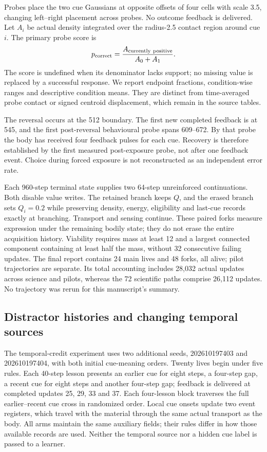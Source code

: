 Probes place the two cue Gaussians at opposite offsets of four cells with scale 3.5, changing left--right placement across probes. No outcome feedback is delivered. Let $A_i$ be actual density integrated over the radius-2.5 contact region around cue $i$. The primary probe score is
\begin{equation}
p_{\rm correct}=\frac{A_{\rm currently\ positive}}{A_0+A_1}.
\end{equation}
The score is undefined when its denominator lacks support; no missing value is replaced by a successful response. We report endpoint fractions, condition-wise ranges and descriptive condition means. They are distinct from time-averaged probe contact or signed centroid displacement, which remain in the source tables.

The reversal occurs at the 512 boundary. The first new completed feedback is at 545, and the first post-reversal behavioural probe spans 609--672. By that probe the body has received four feedback pulses for each cue. Recovery is therefore established by the first measured post-exposure probe, not after one feedback event. Choice during forced exposure is not reconstructed as an independent error rate.

Each 960-step terminal state supplies two 64-step unreinforced continuations. Both disable value writes. The retained branch keeps $Q$, and the erased branch sets $Q_i=0.2$ while preserving density, energy, eligibility and last-cue records exactly at branching. Transport and sensing continue. These paired forks measure expression under the remaining bodily state; they do not erase the entire acquisition history. Viability requires mass at least 12 and a largest connected component containing at least half the mass, without 32 consecutive failing updates. The final report contains 24 main lives and 48 forks, all alive; pilot trajectories are separate. Its total accounting includes 28,032 actual updates across science and pilots, whereas the 72 scientific paths comprise 26,112 updates. No trajectory was rerun for this manuscript's summary.


\subsection*{Distractor histories and changing temporal sources}

The temporal-credit experiment uses two additional seeds, 202610197403 and 202610197404, with both initial cue-meaning orders. Twenty lives begin under five rules. Each 40-step lesson presents an earlier cue for eight steps, a four-step gap, a recent cue for eight steps and another four-step gap; feedback is delivered at completed updates 25, 29, 33 and 37. Each four-lesson block traverses the full earlier--recent cue cross in randomized order. Local cue onsets update two event registers, which travel with the material through the same actual transport as the body. All arms maintain the same auxiliary fields; their rules differ in how those available records are used. Neither the temporal source nor a hidden cue label is passed to a learner.


